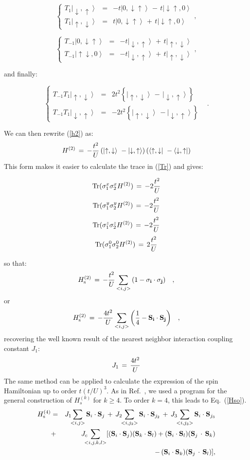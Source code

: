 \documentclass[aps,prb,twocolumn,superscriptaddress,
               amsmath]{revtex4}
\newcommand{\eqn}[1]{\vspace{-0.cm}\begin{equation}
#1
\end{equation}}
\renewcommand{\=}{\,=\,}
\newcommand{\+}{\,+\,}
\renewcommand{\-}{\,-\,}
\newcommand{\f}[2]{{\ensuremath{\mathchoice%
        {\dfrac{#1}{#2}}
        {\dfrac{#1}{#2}}
        {\frac{#1}{#2}}
        {\frac{#1}{#2}}
        }}}
\newcommand{\ket}[1]{\ensuremath{\left| #1 \right\rangle}}
\newcommand{\bra}[1]{\ensuremath{\left\langle #1 \right|}}
\begin{document}
\eqn{\left\{
\begin{array}{ccc}
T_1 \ket{\downarrow,\uparrow} &=& -t \ket{0,\downarrow\uparrow} \- t\ket{\downarrow\uparrow,0}\\
T_1 \ket{\uparrow,\downarrow} &=& t\ket{0,\downarrow\uparrow} \+ t\ket{\downarrow\uparrow,0}
\end{array} \right.,}


\eqn{\left\{
\begin{array}{ccc}
T_{-1} \ket{0,\downarrow\uparrow} &=& -t\ket{\downarrow, \uparrow} \+ t\ket{\uparrow,\downarrow}\\
T_{-1} \ket{\uparrow\downarrow,0} &=& -t\ket{\downarrow, \uparrow} \+ t\ket{\uparrow,\downarrow}
\end{array} \right.,}

and finally:

\eqn{\left\{
\begin{array}{ccc}
T_{-1}T_1 \ket{\uparrow,\downarrow} & = & 2t^2\left\{  \ket{\uparrow,\downarrow} \- \ket{\downarrow, \uparrow} \right\} \\
T_{-1}T_1 \ket{\downarrow,\uparrow} & = & -2t^2\left\{  \ket{\uparrow,\downarrow}\ - \ket{\downarrow, \uparrow} \right\}
\end{array} \right.	\;\;\; .}


We can then rewrite (\ref{h2}) as:
\eqn{H^{(2)} \= -\f{t^2}{U} \left( \ket{\uparrow,\downarrow}\ - \ket{\downarrow, \uparrow}\right) \left( \bra{\uparrow,\downarrow}\ - \bra{\downarrow, \uparrow}\right)}
This form makes it easier to calculate the trace in (\ref{Tr}) and gives:

\eqn{{\rm Tr}(\sigma_1^x\sigma_2^x H^{(2)})\=  -2 \f{t^2}{U}}
\eqn{{\rm Tr}(\sigma_1^y\sigma_2^y H^{(2)})\=  -2 \f{t^2}{U}}
\eqn{{\rm Tr}(\sigma_1^z\sigma_2^z H^{(2)})\=  -2 \f{t^2}{U}}
\eqn{{\rm Tr}(\sigma_1^0\sigma_2^0 H^{(2)})\=  2 \f{t^2}{U}}


so that:
\eqn{H_{\rm s}^{(2)} \= -\f{t^2}{U} \sum_{<i,j>}
\left( 1 - \bf{\sigma_i}  \cdot \bf{\sigma_j} \right)	\;\;\;	, }
or
\eqn{H_{\rm s}^{(2)} \= -\f{4t^2}{U} \sum_{<i,j>}\left( \f{1}{4} - \bf{S_i}  \cdot \bf{S_j} \right)	\;\;\;	, }
recovering the well known result of the nearest neighbor
interaction coupling constant $J_1$:
\eqn{J_1\=\f{4t^2}{U}}
The same method can be applied to calculate the expression of the
spin Hamiltonian up to order $t(t/U)^3$. 
As in Ref.~, we used a program
for the general construction of $H_s^{(k)}$ for $k\ge 4$.
To order $k=4$, this leads to Eq.~(\ref{Hso}).
\begin{eqnarray}
H_{\rm s}^{(4)}
&=&J_1 \!\! \sum_{<i,j>} {\bf S}_i\cdot{\bf S}_j \,+\, J_2 \!\! \sum_{<i,j_2>}
{\bf S}_i\cdot{\bf S}_{j_2} \,+\, J_3 \!\! \sum_{<i,j_3>}
{\bf S}_i\cdot{\bf S}_{j_3}\nonumber\\
&+&J_c \!\!\!\! \sum_{<i,j,k,l>}
[({\bf S}_i \cdot {\bf S}_j)
({\bf S}_k \cdot {\bf S}_l)+({\bf S}_i \cdot {\bf S}_l)
({\bf S}_j\,\cdot\,{\bf S}_k) \nonumber \\
&& \hspace{43pt}\,-\,  ({\bf S}_i \cdot {\bf S}_k)
({\bf S}_j\,\cdot\,{\bf S}_l)
],
\end{eqnarray}
\end{document}
